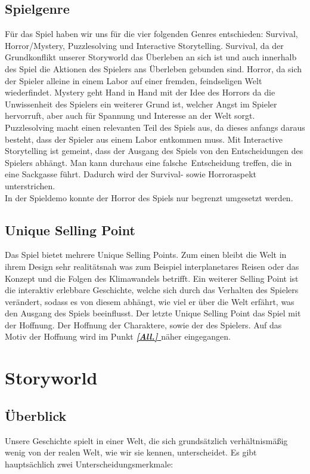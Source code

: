\documentclass[12pt]{article}
\begin{document}
	\subsection{Spielgenre}
		Für das Spiel haben wir uns für die vier folgenden Genres entschieden: Survival, Horror/Mystery, Puzzlesolving und Interactive Storytelling. Survival, da der Grundkonflikt unserer Storyworld das Überleben an sich ist und auch innerhalb des Spiel die Aktionen des Spielers ans Überleben gebunden sind. Horror, da sich der Spieler alleine in einem Labor auf einer fremden, feindseligen Welt wiederfindet. Mystery geht Hand in Hand mit der Idee des Horrors da die Unwissenheit des Spielers ein weiterer Grund ist, welcher Angst im Spieler hervorruft, aber auch für Spannung und Interesse an der Welt sorgt. Puzzlesolving macht einen relevanten Teil des Spiels aus, da dieses anfangs daraus besteht, dass der Spieler aus einem Labor entkommen muss. Mit Interactive Storytelling ist gemeint, dass der Ausgang des Spiels von den Entscheidungen des Spielers abhängt. Man kann durchaus eine \glqq falsche\grqq\ Entscheidung treffen, die in eine Sackgasse führt. Dadurch wird der Survival- sowie Horroraspekt unterstrichen.\\
		In der Spieldemo konnte der Horror des Spiels nur begrenzt umgesetzt werden.
	\subsection{Unique Selling Point}
		Das Spiel bietet mehrere Unique Selling Points. Zum einen bleibt die Welt in ihrem Design sehr realitätsnah was zum Beispiel interplanetares Reisen  oder das Konzept und die Folgen des Klimawandels betrifft.\newline 
		Ein weiterer Selling Point ist die interaktiv erlebbare Geschichte, welche sich durch das Verhalten des Spielers verändert, sodass es von diesem abhängt, wie viel er über die Welt erfährt, was den Ausgang des Spiels beeinflusst.\newline
		Der letzte Unique Selling Point das Spiel mit der Hoffnung. Der Hoffnung der Charaktere, sowie der des Spielers. Auf das Motiv der Hoffnung wird im Punkt \textbf{\textit{\hyperref[All.]{\ref{All.} }}} näher eingegangen.
		
	\newpage
	\section{Storyworld}
	
	
	\subsection{Überblick}
	Unsere Geschichte spielt in einer Welt, die sich grundsätzlich verhältnismäßig wenig von der realen Welt, wie wir sie kennen, unterscheidet. Es gibt hauptsächlich zwei Unterscheidungsmerkmale:
	
\end{document}
